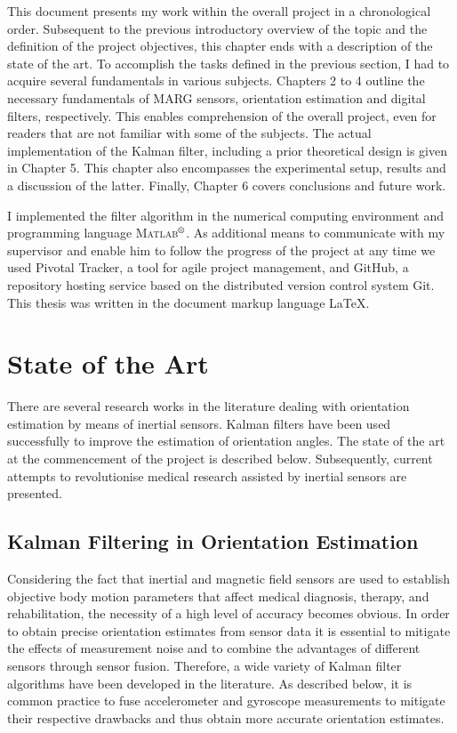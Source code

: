 This document presents my work within the overall project in a chronological order. Subsequent to the previous introductory overview of the topic and the definition of the project objectives, this chapter ends with a description of the state of the art. To accomplish the tasks defined in the previous section, I had to acquire several fundamentals in various subjects. Chapters 2 to 4 outline the necessary fundamentals of MARG sensors, orientation estimation and digital filters, respectively.  This enables comprehension of the overall project, even for readers that are not familiar with some of the subjects. The actual implementation of the Kalman filter, including a prior theoretical design is given in Chapter 5. This chapter also encompasses the experimental setup, results and a discussion of the latter. Finally, Chapter 6 covers conclusions and future work.

I implemented the filter algorithm in the numerical computing environment and programming language \textsc{Matlab}$\textsuperscript{\textregistered}$. As additional means to communicate with my supervisor and enable him to follow the progress of the project at any time we used Pivotal Tracker, a tool for agile project management, and GitHub, a repository hosting service based on the distributed version control system Git. This thesis was written in the document markup language \LaTeX{}.
 
\section{State of the Art}\label{sec:state_of_the_art}

There are several research works in the literature dealing with orientation estimation by means of inertial sensors. Kalman filters have been used successfully to improve the estimation of orientation angles. The state of the art at the commencement of the project is described below. Subsequently, current attempts to revolutionise medical research assisted by inertial sensors are presented.

\subsection{Kalman Filtering in Orientation Estimation}

Considering the fact that inertial and magnetic field sensors are used to establish objective body motion parameters that affect medical diagnosis, therapy, and rehabilitation, the necessity of a high level of accuracy becomes obvious. In order to obtain precise orientation estimates from sensor data it is essential to mitigate the effects of measurement noise and to combine the advantages of different  sensors through sensor fusion. Therefore, a wide variety of Kalman filter algorithms have been developed in the literature. As described below, it is common practice to fuse accelerometer and gyroscope measurements to mitigate their respective drawbacks and thus obtain more accurate orientation estimates.

